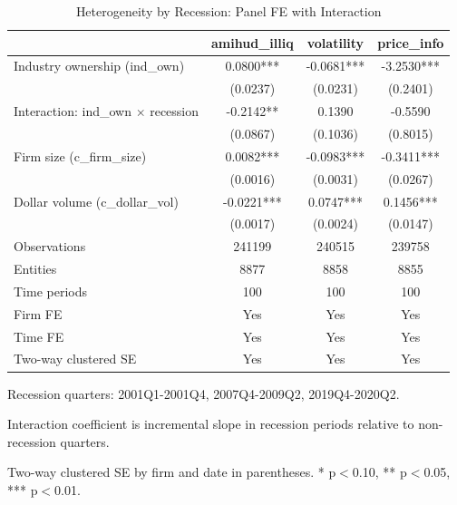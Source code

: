 \begin{table}[!htbp]\centering
\caption{Heterogeneity by Recession: Panel FE with Interaction}
\label{tab:recession_interaction}
\begin{tabular}{lccc}
\toprule
 & amihud_illiq & volatility & price_info \\
\midrule
Industry ownership (ind_own) & 0.0800*** & -0.0681*** & -3.2530*** \\
 & (0.0237) & (0.0231) & (0.2401) \\
Interaction: ind_own $\times$ recession & -0.2142** & 0.1390 & -0.5590 \\
 & (0.0867) & (0.1036) & (0.8015) \\
Firm size (c_firm_size) & 0.0082*** & -0.0983*** & -0.3411*** \\
 & (0.0016) & (0.0031) & (0.0267) \\
Dollar volume (c_dollar_vol) & -0.0221*** & 0.0747*** & 0.1456*** \\
 & (0.0017) & (0.0024) & (0.0147) \\
\midrule
Observations & 241199 & 240515 & 239758 \\
Entities & 8877 & 8858 & 8855 \\
Time periods & 100 & 100 & 100 \\
Firm FE & Yes & Yes & Yes \\
Time FE & Yes & Yes & Yes \\
Two-way clustered SE & Yes & Yes & Yes \\
\bottomrule
\end{tabular}
\begin{tablenotes}\footnotesize
\item Recession quarters: 2001Q1-2001Q4, 2007Q4-2009Q2, 2019Q4-2020Q2.
\item Interaction coefficient is incremental slope in recession periods relative to non-recession quarters.
\item Two-way clustered SE by firm and date in parentheses. * p$<$0.10, ** p$<$0.05, *** p$<$0.01.
\end{tablenotes}
\end{table}
